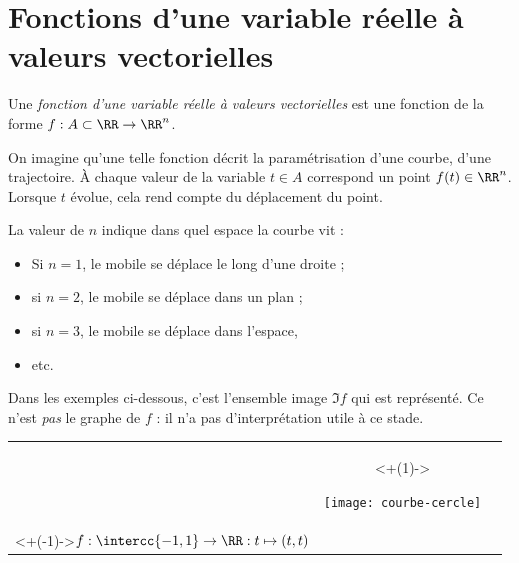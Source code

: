 \section{Fonctions d'une variable réelle à valeurs vectorielles}
\begin{frame}
\begin{definition}
  Une \emph{fonction d'une variable réelle à valeurs vectorielles} est une fonction de la forme \(f : A \subset \RR \to \RR^{n}\).\pause{}
\end{definition}

  On imagine qu'une telle fonction décrit la paramétrisation d'une courbe, d'une trajectoire.\pause{} À chaque valeur de la variable \(t\in A\) correspond un point \(f(t)\in \RR^n\). Lorsque \(t\) évolue, cela rend compte du déplacement du point.\pause{}

  La valeur de \(n\) indique dans quel espace la courbe \og vit\fg{} :\pause{}
  \begin{itemize}
  \item Si \(n = 1\), le mobile se déplace le long d'une droite ;\pause{}
  \item si \(n = 2\), le mobile se déplace dans un plan ;\pause{}
  \item si \(n = 3\), le mobile se déplace dans l'espace,
  \item etc.
  \end{itemize}
\end{frame}

\begin{frame}
  \begin{example}Dans les exemples ci-dessous, c'est l'ensemble image \(\Im f\) qui est représenté.\pause{} Ce n'est \emph{pas} le graphe de \(f\)\pause{} : il n'a pas d'interprétation utile à ce stade.\pause{}
    \begin{center}
      \begin{tabular}{ccc}
        \uncover<+->{\begin{minipage}{0.30\linewidth}
            \texttt{[image: courbe-droite]}
          \end{minipage}}%
        & \uncover<+(1)->{\begin{minipage}{0.30\linewidth}
            \texttt{[image: courbe-cercle]}
          \end{minipage}}\\
        \uncover<+(-1)->{\mbox{\(f : \intercc{-1,1} \to \RR : t \mapsto (t,t)\)}}%
        & \uncover<+->{ \mbox{\(f : \intercc{-\pi, \sfrac\pi2} \to \RR : t \mapsto (\cos t,\sin t)\)}}
      \end{tabular}
    \end{center}
  \end{example}
\end{frame}

